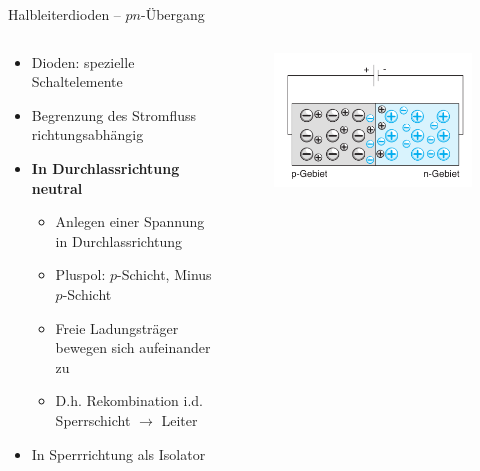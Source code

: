 \documentclass[12pt%
,aspectratio=169%
]{beamer}
\begin{document}
\begin{frame}{Halbleiterdioden -- $pn$-Übergang}
\begin{columns}[T] %
\begin{column}{.48\textwidth}
\begin{itemize}
	\item Dioden: spezielle Schaltelemente
	\item Begrenzung des Stromﬂuss richtungsabhängig
	\item \textbf{In Durchlassrichtung neutral}
	\begin{itemize}
		\item Anlegen einer Spannung in Durchlassrichtung
		\item Pluspol: $p$-Schicht, Minus $p$-Schicht
		\item Freie Ladungsträger bewegen sich aufeinander zu
		\item D.h. Rekombination i.d. Sperrschicht $\to$ Leiter
	\end{itemize}
	\item In Sperrrichtung als Isolator
\end{itemize}
\end{column}%
\hfill%
\begin{column}{.48\textwidth}
\begin{figure}
\center
\includegraphics[scale=0.5]{pictures/durchlass}
\end{figure}
\end{column}%
\end{columns}
\end{frame}
\end{document}
